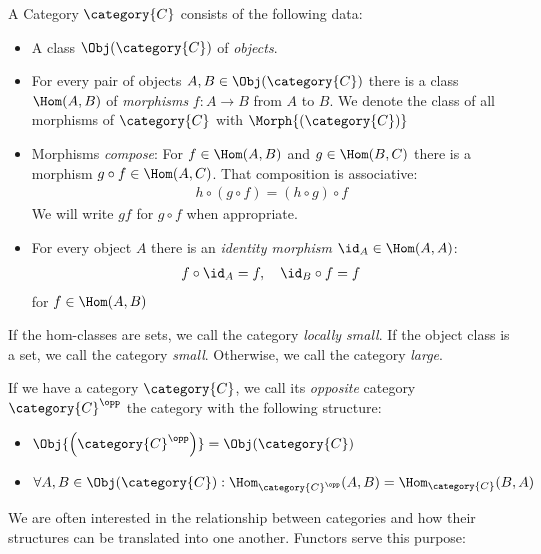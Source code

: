 \documentclass[DIN, pagenumber=false, fontsize=11pt, parskip=half, colorinlistoftodos, svgnames]{scrartcl}
\begin{document}
	\begin{definition}[Category]
		\label{def: cat}
		A Category $\category{C}$ consists of the following data: 
		\begin{itemize}
			\item 
				A class $\Obj(\category{C})$ of \emph{objects}.
			\item 
				For every pair of objects $A, B \in \Obj(\category{C})$ there is a class $\Hom(A, B)$ of \emph{morphisms} $f: A \rightarrow B$ from $A$ to $B$. 
				We denote the class of all morphisms of $\category{C}$ with $\Morph{(\category{C})}$
			\item 
				Morphisms \emph{compose}: For $f \in \Hom(A, B)$ and $g \in \Hom(B, C)$ there is a morphism $g \circ  f \in \Hom(A, C)$. 
				That composition is associative: 
				\begin{align*}
					h \circ (g \circ f) = (h \circ g) \circ f
				\end{align*}
				We will write $gf$ for $g\circ f$ when appropriate.
			\item 
				For every object $A$ there is an \emph{identity morphism} $\id_A \in \Hom(A, A)$:
				\begin{align*}
					f \circ \id_A = f, \quad \id_B \circ f = f
				\end{align*}
				for $f \in \Hom(A, B)$
		\end{itemize}
		If the hom-classes are sets, we call the category \emph{locally small}. If the object class is a set, we call the category \emph{small}. Otherwise, we call the category \emph{large}.
		
		If we have a category $\category{C} $, we call its \emph{opposite} category $\category{C}^\opp $ the category with the following structure:
		\begin{itemize}
			\item $\Obj{\left(\category{C}^\opp \right)} = \Obj(\category{C}) $
			\item $\forall A, B \in \Obj(\category{C}): 
			\Hom_{\category{C}^\opp }(A,B) = \Hom_{\category{C}}(B,A)$
		\end{itemize}
	\end{definition}
	
	We are often interested in the relationship between categories and how their structures can be translated into one another. Functors serve this purpose:
	
\end{document}
